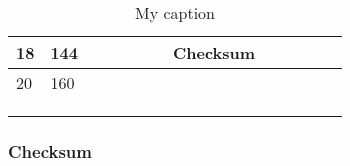 \begin{table}[H]
\begin{tabular}{llclllllllllllllll}
\multicolumn{1}{|l|}{18}   & \multicolumn{1}{l|}{144} & \multicolumn{16}{c|}{Checksum}                                                                                                                                                                                                                                                                                                                                                                                      \\ \hline
\multicolumn{1}{|l|}{20}   & \multicolumn{1}{l|}{160} & \multicolumn{8}{c|}{}                                                                                                                                                                                 & \multicolumn{1}{l|}{}  & \multicolumn{1}{l|}{}  & \multicolumn{1}{l|}{}   & \multicolumn{1}{l|}{}   & \multicolumn{1}{l|}{}   & \multicolumn{1}{l|}{}   & \multicolumn{1}{l|}{}   & \multicolumn{1}{l|}{}   \\ \hline
                           &                          & \multicolumn{1}{l}{}   &                        &                        &                        &                        &                        &                        &                        &                        &                        &                         &                         &                         &                         &                         &                         \\
                           &                          & \multicolumn{1}{l}{}   &                        &                        &                        &                        &                        &                        &                        &                        &                        &                         &                         &                         &                         &                         &                         \\
                           &                          & \multicolumn{1}{l}{}   &                        &                        &                        &                        &                        &                        &                        &                        &                        &                         &                         &                         &                         &                         &                        
\end{tabular}
\caption{My caption}
\label{tab:Packagestructure}
\end{table}






\subsubsection{Checksum}








